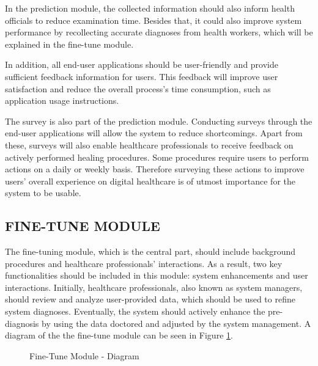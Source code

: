 In the prediction module, the collected information should also inform health officials to reduce examination time. Besides that, it could also improve system performance by recollecting accurate diagnoses from health workers, which will be explained in the fine-tune module.

In addition, all end-user applications should be user-friendly and provide sufficient feedback information for users. This feedback will improve user satisfaction and reduce the overall process's time consumption, such as application usage instructions.

The survey is also part of the prediction module. Conducting surveys through the end-user applications will allow the system to reduce shortcomings. Apart from these, surveys will also enable healthcare professionals to receive feedback on actively performed healing procedures. Some procedures require users to perform actions on a daily or weekly basis. Therefore surveying these actions to improve users' overall experience on digital healthcare is of utmost importance for the system to be usable.

\subsection{ FINE-TUNE MODULE }

The fine-tuning module, which is the central part, should include background procedures and healthcare professionals' interactions. As a result, two key functionalities should be included in this module: system enhancements and user interactions. Initially, healthcare professionals, also known as system managers, should review and analyze user-provided data, which should be used to refine system diagnoses. Eventually, the system should actively enhance the pre-diagnosis by using the data doctored and adjusted by the system management. A diagram of the the fine-tune module can be seen in Figure \ref{fig:FineTuneModuleDiagram}.


\begin{figure}[htbp]
\centering
{}
\caption{Fine-Tune Module - Diagram}
\label{fig:FineTuneModuleDiagram}
\end{figure}

